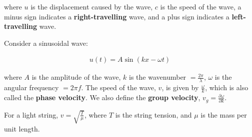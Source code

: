 \documentclass[10pt,a4paper]{article}
\begin{document}
where $u$ is the displacement caused by the wave, $c$ is the speed of the wave, a minus sign indicates a \textbf{right-travelling} wave, and a plus sign indicates a \textbf{left-travelling} wave.

Consider a sinusoidal wave:

\begin{align*}
u(t) = A \sin(kx - \omega t)
\end{align*}

where $A$ is the amplitude of the wave, $k$ is the wavenumber $= \frac{2\pi}{\lambda}$, $\omega$ is the angular frequency $= 2\pi f$. The speed of the wave, $v$, is given by $\frac{\omega}{k}$, which is also called the \textbf{phase velocity}. We also define the \textbf{group velocity}, $v_g = \frac{\partial \omega}{\partial k}$.

For a light string, $v = \sqrt{\frac{T}{\mu}}$, where $T$ is the string tension, and $\mu$ is the mass per unit length.
\end{document}
